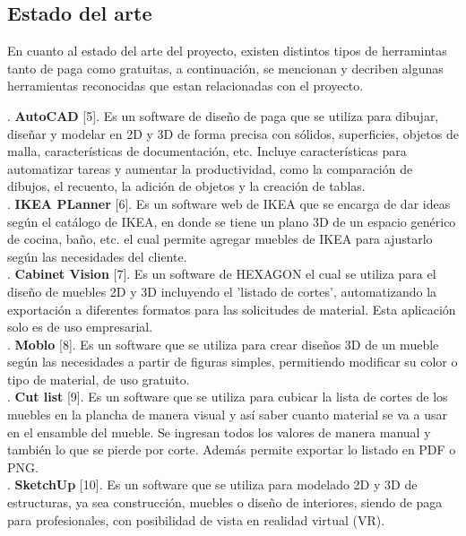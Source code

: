 \documentclass[12pt,oneside]{article}
\begin{document}
\subsection{Estado del arte}
En cuanto al estado del arte del proyecto, existen distintos tipos de herramintas tanto de paga como gratuitas, a continuación, se mencionan y decriben algunas herramientas reconocidas que estan relacionadas con el proyecto.

. \textbf{AutoCAD} [5].  Es un software de diseño de paga que se utiliza para dibujar, diseñar y modelar en 2D y 3D de forma precisa con sólidos, superficies, objetos de malla, características de documentación, etc. Incluye características para automatizar tareas y aumentar la productividad, como la comparación de dibujos, el recuento, la adición de objetos y la creación de tablas.\\

. \textbf{IKEA PLanner} [6]. Es un software web de IKEA que se encarga de dar ideas según el catálogo de IKEA, en donde se tiene un plano 3D de un espacio genérico de cocina, baño, etc. el cual permite agregar muebles de IKEA para ajustarlo según las necesidades del cliente. \\

. \textbf{Cabinet Vision} [7]. Es un software de HEXAGON el cual se utiliza para el diseño de muebles 2D y 3D incluyendo el 'listado de cortes', automatizando la exportación a diferentes formatos para las solicitudes de material. Esta aplicación solo es de uso empresarial.\\

. \textbf{Moblo} [8]. Es un software que se utiliza para crear diseños 3D de un mueble según las necesidades a partir de figuras simples, permitiendo modificar su color o tipo de material, de uso gratuito. \\

. \textbf{Cut list} [9]. Es un software que se utiliza para cubicar la lista de cortes de los muebles en la plancha de manera visual y así saber cuanto material se va a usar en el ensamble del mueble. Se ingresan todos los valores de manera manual y también lo que se pierde por corte. Además permite exportar lo listado en PDF o PNG.\\ 

. \textbf{SketchUp} [10]. Es un software que se utiliza para modelado 2D y 3D de estructuras, ya sea cons\-trucción, muebles o diseño de interiores, siendo de paga para profesionales, con posibilidad de vista en realidad virtual (VR).\\
\end{document}
